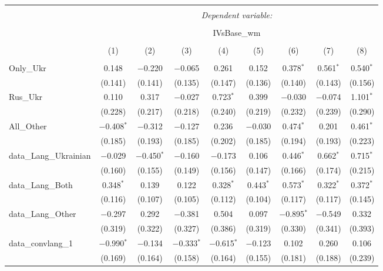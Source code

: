 
\begin{table}[!htbp] \centering 
  \caption{} 
  \label{} 
\tiny 
\begin{tabular}{@{\extracolsep{1pt}}lcccccccc} 
\\[-1.8ex]\hline 
\hline \\[-1.8ex] 
 & \multicolumn{8}{c}{\textit{Dependent variable:}} \\ 
\cline{2-9} 
\\[-1.8ex] & \multicolumn{8}{c}{IVsBase\_wm} \\ 
\\[-1.8ex] & (1) & (2) & (3) & (4) & (5) & (6) & (7) & (8)\\ 
\hline \\[-1.8ex] 
 Only\_Ukr & 0.148 & $-$0.220 & $-$0.065 & 0.261 & 0.152 & 0.378$^{*}$ & 0.561$^{*}$ & 0.540$^{*}$ \\ 
  & (0.141) & (0.141) & (0.135) & (0.147) & (0.136) & (0.140) & (0.143) & (0.156) \\ 
  Rus\_Ukr & 0.110 & 0.317 & $-$0.027 & 0.723$^{*}$ & 0.399 & $-$0.030 & $-$0.074 & 1.101$^{*}$ \\ 
  & (0.228) & (0.217) & (0.218) & (0.240) & (0.219) & (0.232) & (0.239) & (0.290) \\ 
  All\_Other & $-$0.408$^{*}$ & $-$0.312 & $-$0.127 & 0.236 & $-$0.030 & 0.474$^{*}$ & 0.201 & 0.461$^{*}$ \\ 
  & (0.185) & (0.193) & (0.185) & (0.202) & (0.185) & (0.194) & (0.193) & (0.223) \\ 
  data\_Lang\_Ukrainian & $-$0.029 & $-$0.450$^{*}$ & $-$0.160 & $-$0.173 & 0.106 & 0.446$^{*}$ & 0.662$^{*}$ & 0.715$^{*}$ \\ 
  & (0.160) & (0.155) & (0.149) & (0.156) & (0.147) & (0.166) & (0.174) & (0.215) \\ 
  data\_Lang\_Both & 0.348$^{*}$ & 0.139 & 0.122 & 0.328$^{*}$ & 0.443$^{*}$ & 0.573$^{*}$ & 0.322$^{*}$ & 0.372$^{*}$ \\ 
  & (0.116) & (0.107) & (0.105) & (0.112) & (0.104) & (0.117) & (0.117) & (0.145) \\ 
  data\_Lang\_Other & $-$0.297 & 0.292 & $-$0.381 & 0.504 & 0.097 & $-$0.895$^{*}$ & $-$0.549 & 0.332 \\ 
  & (0.319) & (0.322) & (0.327) & (0.386) & (0.319) & (0.330) & (0.341) & (0.393) \\ 
  data\_convlang\_1 & $-$0.990$^{*}$ & $-$0.134 & $-$0.333$^{*}$ & $-$0.615$^{*}$ & $-$0.123 & 0.102 & 0.260 & 0.106 \\ 
  & (0.169) & (0.164) & (0.158) & (0.164) & (0.155) & (0.181) & (0.188) & (0.239) \\ 

\end{tabular}
\end{table}

